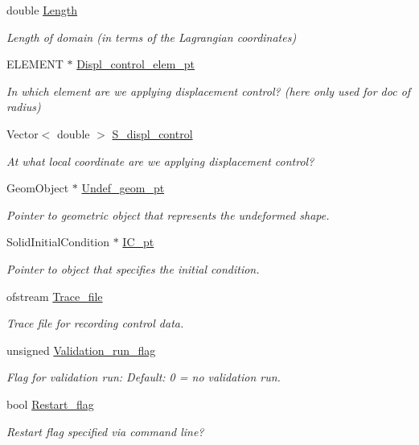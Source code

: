 \begin{DoxyCompactItemize}
\item 
double \hyperlink{classElasticRingProblem_a74aac22a4e8673b1e58c024610f8220f}{Length}
\begin{DoxyCompactList}\small\item\em Length of domain (in terms of the Lagrangian coordinates) \end{DoxyCompactList}\item 
E\+L\+E\+M\+E\+NT $\ast$ \hyperlink{classElasticRingProblem_aba78b855677ef08ea3d9678dcde8a71b}{Displ\+\_\+control\+\_\+elem\+\_\+pt}
\begin{DoxyCompactList}\small\item\em In which element are we applying displacement control? (here only used for doc of radius) \end{DoxyCompactList}\item 
Vector$<$ double $>$ \hyperlink{classElasticRingProblem_a0acfcb485441bbe0c9e4202d8a5e72d3}{S\+\_\+displ\+\_\+control}
\begin{DoxyCompactList}\small\item\em At what local coordinate are we applying displacement control? \end{DoxyCompactList}\item 
Geom\+Object $\ast$ \hyperlink{classElasticRingProblem_ab0f0f02cc67dcabfc38f051e3d3cebfc}{Undef\+\_\+geom\+\_\+pt}
\begin{DoxyCompactList}\small\item\em Pointer to geometric object that represents the undeformed shape. \end{DoxyCompactList}\item 
Solid\+Initial\+Condition $\ast$ \hyperlink{classElasticRingProblem_a0d314051b66afb53fa7f28c298f38206}{I\+C\+\_\+pt}
\begin{DoxyCompactList}\small\item\em Pointer to object that specifies the initial condition. \end{DoxyCompactList}\item 
ofstream \hyperlink{classElasticRingProblem_a7f0f8c10b57021446e19c5833863cc7f}{Trace\+\_\+file}
\begin{DoxyCompactList}\small\item\em Trace file for recording control data. \end{DoxyCompactList}\item 
unsigned \hyperlink{classElasticRingProblem_a16c967c1a9fbb26b9e640651883e59d8}{Validation\+\_\+run\+\_\+flag}
\begin{DoxyCompactList}\small\item\em Flag for validation run\+: Default\+: 0 = no validation run. \end{DoxyCompactList}\item 
bool \hyperlink{classElasticRingProblem_a6be2bdf76434e5f69e105199e0ba3ab6}{Restart\+\_\+flag}
\begin{DoxyCompactList}\small\item\em Restart flag specified via command line? \end{DoxyCompactList}\end{DoxyCompactItemize}


